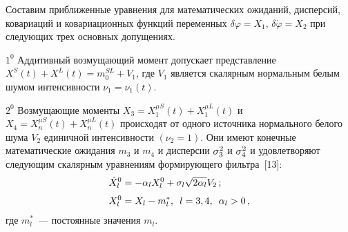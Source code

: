 \begin{multicols}{2}
Составим приближенные уравнения для математических ожиданий, дисперсий,
ковариаций и ковариационных функций переменных $\delta \varphi = X_1$,
$\delta \dot\varphi = X_2$ при следующих трех основных допуще\-ниях.

\begin{description}
\item $1^0$ Аддитивный возмущающий момент допускает представление
$X^S (t) + X^L (t) = m_0^{SL}+V_1$, где $V_1 $ является скалярным
нормальным белым шумом интенсивности $\nu_1 = \nu_1(t)$.

\item $2^0$ Возмущающие моменты $X_3 = X^{\mu S}_1 (t) + X_1^{\mu L} (t)$
и $X_4 = X_n^{\mu S} (t) + X_n^{\mu L}(t)$ происходят от одного
источника нормального белого шума $V_2$ единичной интенсивности
$(\nu_2 =1)$. Они имеют конечные математические ожидания $m_3$ и
$m_4$ и дисперсии $\sigma_3^2$ и $\sigma_4^2$ и удовлетворяют следующим
скалярным уравнениям формирующего фильтра~[13]:
\begin{align}
 \dot X_l^0 &=-\alpha_l X_l^0 + \sigma_l \sqrt{2\alpha_l} V_2\,;\notag\\[-6pt]
&\label{e2}\\[-6pt]
 X_l^0 &= X_l- m_l^*,\enskip l=3,4,\enskip \alpha_l>0\,,\notag
\end{align}
где $m_l^*$~--- постоянные значения $m_l$.


\end{description}
\end{multicols}
